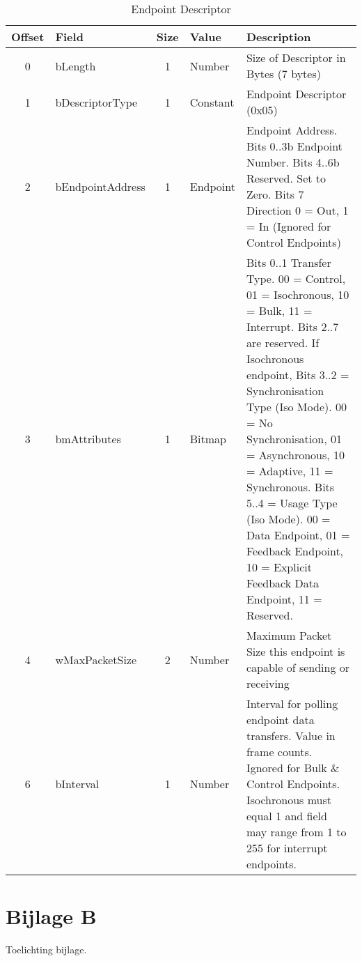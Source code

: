 \begin{appendices}
\begin{table}[h]
\centering
\label{tab:usb_endpoint_descriptor}
\begin{tabular}{|c|l|c|l|p{8cm}|}
\hline
\textbf{Offset} & \textbf{Field} & \textbf{Size} & \textbf{Value} & \textbf{Description} \\ \hline
0 & bLength & 1 & Number & Size of Descriptor in Bytes (7 bytes) \\ \hline
1 & bDescriptorType & 1 & Constant & Endpoint Descriptor (0x05) \\ \hline
2 & bEndpointAddress & 1 & Endpoint & Endpoint Address. Bits 0..3b Endpoint Number. Bits 4..6b Reserved. Set to Zero. Bits 7 Direction 0 = Out, 1 = In (Ignored for Control Endpoints) \\ \hline
3 & bmAttributes & 1 & Bitmap & Bits 0..1 Transfer Type. 00 = Control, 01 = Isochronous, 10 = Bulk, 11 = Interrupt. Bits 2..7 are reserved. If Isochronous endpoint, Bits 3..2 = Synchronisation Type (Iso Mode). 00 = No Synchronisation, 01 = Asynchronous, 10 = Adaptive, 11 = Synchronous. Bits 5..4 = Usage Type (Iso Mode). 00 = Data Endpoint, 01 = Feedback Endpoint, 10 = Explicit Feedback Data Endpoint, 11 = Reserved. \\ \hline
4 & wMaxPacketSize & 2 & Number & Maximum Packet Size this endpoint is capable of sending or receiving \\ \hline
6 & bInterval & 1 & Number & Interval for polling endpoint data transfers. Value in frame counts. Ignored for Bulk \& Control Endpoints. Isochronous must equal 1 and field may range from 1 to 255 for interrupt endpoints. \\ \hline
\end{tabular}
\caption{Endpoint Descriptor}
\end{table}



\newpage
\section*{Bijlage B}

Toelichting bijlage.

\end{appendices}

